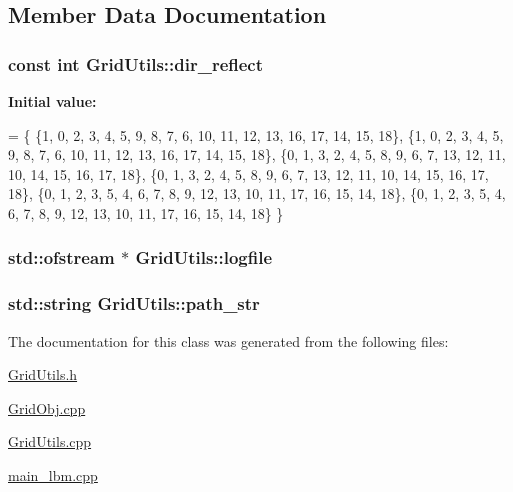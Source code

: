 \subsection{Member Data Documentation}
\subsubsection[{\texorpdfstring{dir\+\_\+reflect}{dir_reflect}}]{\setlength{\rightskip}{0pt plus 5cm}const int Grid\+Utils\+::dir\+\_\+reflect\hspace{0.3cm}{\ttfamily [static]}}\hypertarget{class_grid_utils_a609ef43c9476067a52ee238cd3d594f2}{}\label{class_grid_utils_a609ef43c9476067a52ee238cd3d594f2}
{\bfseries Initial value\+:}
\begin{DoxyCode}
= 
    \{
        \{1, 0, 2, 3, 4, 5, 9, 8, 7, 6, 10, 11, 12, 13, 16, 17, 14, 15, 18\}, 
        \{1, 0, 2, 3, 4, 5, 9, 8, 7, 6, 10, 11, 12, 13, 16, 17, 14, 15, 18\},
        \{0, 1, 3, 2, 4, 5, 8, 9, 6, 7, 13, 12, 11, 10, 14, 15, 16, 17, 18\},
        \{0, 1, 3, 2, 4, 5, 8, 9, 6, 7, 13, 12, 11, 10, 14, 15, 16, 17, 18\},
        \{0, 1, 2, 3, 5, 4, 6, 7, 8, 9, 12, 13, 10, 11, 17, 16, 15, 14, 18\},
        \{0, 1, 2, 3, 5, 4, 6, 7, 8, 9, 12, 13, 10, 11, 17, 16, 15, 14, 18\}
    \}
\end{DoxyCode}
\subsubsection[{\texorpdfstring{logfile}{logfile}}]{\setlength{\rightskip}{0pt plus 5cm}std\+::ofstream $\ast$ Grid\+Utils\+::logfile\hspace{0.3cm}{\ttfamily [static]}}\hypertarget{class_grid_utils_a298239096e929c1ba4eba925e351c1b3}{}\label{class_grid_utils_a298239096e929c1ba4eba925e351c1b3}
\subsubsection[{\texorpdfstring{path\+\_\+str}{path_str}}]{\setlength{\rightskip}{0pt plus 5cm}std\+::string Grid\+Utils\+::path\+\_\+str\hspace{0.3cm}{\ttfamily [static]}}\hypertarget{class_grid_utils_a9b58748e9e05e84852962d7abc7942e3}{}\label{class_grid_utils_a9b58748e9e05e84852962d7abc7942e3}


The documentation for this class was generated from the following files\+:\begin{DoxyCompactItemize}
\item 
\hyperlink{_grid_utils_8h}{Grid\+Utils.\+h}\item 
\hyperlink{_grid_obj_8cpp}{Grid\+Obj.\+cpp}\item 
\hyperlink{_grid_utils_8cpp}{Grid\+Utils.\+cpp}\item 
\hyperlink{main__lbm_8cpp}{main\+\_\+lbm.\+cpp}\end{DoxyCompactItemize}
